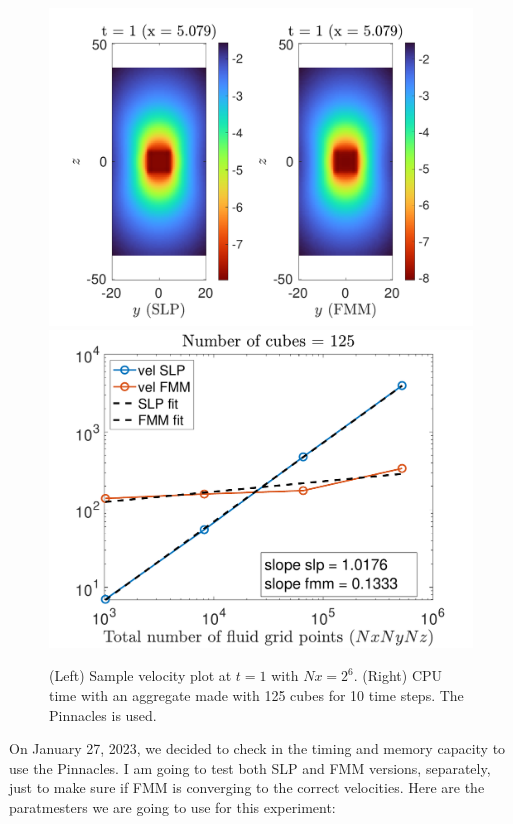 \begin{figure}[ht]
	\begin{center}
		\includegraphics[scale=0.42]{./figures/fig_vel_mm5_t1}
		\includegraphics[scale=0.4]{./figures/fig_time_both_mm5_Nt10}
	\caption{(Left) Sample velocity plot at $t=1$ with $Nx = 2^6$. (Right) CPU time with an aggregate made with 125 cubes for 10 time steps. The Pinnacles is used.}
	\label{fig_vel_mm5_t1}
\end{center}
\end{figure}
\clearpage
On January 27, 2023, we decided to check in the timing and memory capacity to use the Pinnacles. I am going to test both SLP and FMM versions, separately, just to make sure if FMM is converging to the correct velocities. Here are the paratmesters we are going to use for this experiment:

